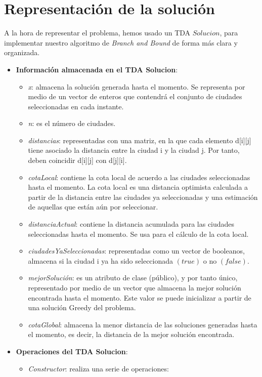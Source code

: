\documentclass{article}
\begin{document}
	\section{Representación de la solución}
	A la hora de representar el problema, hemos usado un TDA $Solucion$, para implementar nuestro algoritmo de \textit{Branch and Bound} de forma más clara y organizada.
	\begin{itemize}
		\item \textbf{Información almacenada en el TDA Solucion}:
		\begin{itemize}
			\item \textit {x}: almacena la solución generada hasta el momento. Se representa por medio de un vector de enteros que contendrá el conjunto de ciudades seleccionadas en cada instante.
			\item \textit {n}: es el número de ciudades.
			\item \textit{distancias}: representadas con una matriz, en la que cada elemento d[i][j] tiene asociado la distancia entre la ciudad i y la ciudad j. Por tanto, deben coincidir d[i][j] con d[j][i].
			\item \textit {cotaLocal}: contiene la cota local de acuerdo a las ciudades seleccionadas hasta el momento. La cota local es una distancia optimista calculada a partir de la distancia entre las ciudades ya seleccionadas y una estimación de aquellas que están aún por seleccionar.
			\item \textit {distanciaActual}: contiene la distancia acumulada para las ciudades seleccionadas hasta el momento. Se usa para el cálculo de la cota local.
			\item \textit {ciudadesYaSeleccionadas}: representadas como un vector de booleanos, almacena si la ciudad i ya ha sido seleccionada $(true)$ o no $(false).$
			\item \textit {mejorSolución}: es un atributo de clase (público), y por tanto único, representado por medio de un vector que almacena la mejor solución encontrada hasta el momento. Este valor se puede inicializar a partir de una solución Greedy del problema.
			\item \textit {cotaGlobal}: almacena la menor distancia de las soluciones generadas hasta el momento, es decir, la distancia de la mejor solución encontrada.
		\end{itemize}
		\item \textbf{Operaciones del TDA Solucion}:
		\begin{itemize}
			\item \textit {Constructor}: realiza una serie de operaciones:

\end{itemize}
\end{itemize}
\end{document}

